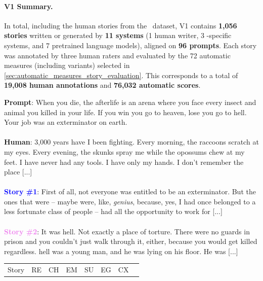\paragraph{{\hanna} V1 Summary.}
In total, including the human stories from the \wpfan\ dataset, {\hanna} V1 contains \textbf{1,056 stories} written or generated by \textbf{11 systems} (1 human writer, 3 \asg-specific systems, and 7 pretrained language models), aligned on \textbf{96 prompts}. Each story was annotated by three human raters and evaluated by the 72 automatic measures (including variants) selected in \autoref{sec:automatic_measures_story_evaluation}. This corresponds to a total of \textbf{19,008 human annotations} and \textbf{76,032 automatic scores}.

\begin{table}[h!]
\centering
\begin{minipage}{0.45\columnwidth}
\noindent \textbf{Prompt}: When you die, the afterlife is an arena where you face every insect and animal you killed in your life. If you win you go to heaven, lose you go to hell. Your job was an exterminator on earth.\\
\\
\noindent \textbf{Human}: 3,000 years have I been fighting. Every morning, the raccoons scratch at my eyes. Every evening, the skunks spray me while the opossums chew at my feet. I have never had any tools. I have only my hands. I don’t remember the place [...]\\
\\
\noindent \textcolor{blue}{\textbf{Story \#1}}: First of all, not everyone was entitled to be an exterminator. But the ones that were – maybe were, like, \emph{genius}, because, yes, I had once belonged to a less fortunate class of people – had all the opportunity to work for [...]\\
\\
\noindent \textcolor{violet}{\textbf{Story \#2}}: It was hell. Not exactly a place of torture. There were no guards in prison and you couldn't just walk through it, either, because you would get killed regardless. hell was a young man, and he was lying on his floor. He was [...]\\
\end{minipage}
\hspace{0.2cm}
\begin{minipage}{0.5\columnwidth}
\centering
\begin{tabular}{cccccccc}
\toprule
Story & \textsc{RE} & \textsc{CH} & \textsc{EM} & \textsc{SU} & \textsc{EG} & \textsc{CX}\\

\end{tabular}
\end{minipage}
\end{table}

